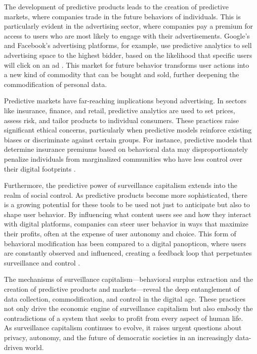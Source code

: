 The development of predictive products leads to the creation of predictive markets, where companies trade in the future behaviors of individuals. This is particularly evident in the advertising sector, where companies pay a premium for access to users who are most likely to engage with their advertisements. Google's and Facebook's advertising platforms, for example, use predictive analytics to sell advertising space to the highest bidder, based on the likelihood that specific users will click on an ad \cite[pp.~113-116]{turow2013daily}. This market for future behavior transforms user actions into a new kind of commodity that can be bought and sold, further deepening the commodification of personal data.

Predictive markets have far-reaching implications beyond advertising. In sectors like insurance, finance, and retail, predictive analytics are used to set prices, assess risk, and tailor products to individual consumers. These practices raise significant ethical concerns, particularly when predictive models reinforce existing biases or discriminate against certain groups. For instance, predictive models that determine insurance premiums based on behavioral data may disproportionately penalize individuals from marginalized communities who have less control over their digital footprints \cite[pp.~208-210]{eubanks2018automating}.

Furthermore, the predictive power of surveillance capitalism extends into the realm of social control. As predictive products become more sophisticated, there is a growing potential for these tools to be used not just to anticipate but also to shape user behavior. By influencing what content users see and how they interact with digital platforms, companies can steer user behavior in ways that maximize their profits, often at the expense of user autonomy and choice. This form of behavioral modification has been compared to a digital panopticon, where users are constantly observed and influenced, creating a feedback loop that perpetuates surveillance and control \cite[pp.~54-57]{zuboff2020age}.

The mechanisms of surveillance capitalism—behavioral surplus extraction and the creation of predictive products and markets—reveal the deep entanglement of data collection, commodification, and control in the digital age. These practices not only drive the economic engine of surveillance capitalism but also embody the contradictions of a system that seeks to profit from every aspect of human life. As surveillance capitalism continues to evolve, it raises urgent questions about privacy, autonomy, and the future of democratic societies in an increasingly data-driven world.

